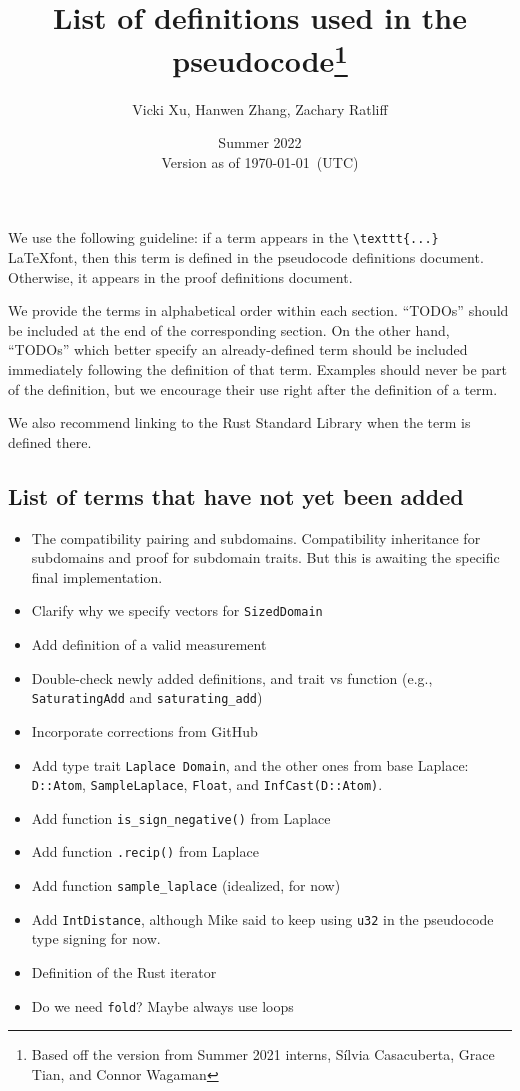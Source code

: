 \documentclass[11pt,a4paper]{article}
\title{List of definitions used in the pseudocode\footnote{Based off the version from Summer 2021 interns, S\'ilvia Casacuberta, Grace Tian, and Connor Wagaman}}
\author{Vicki Xu, Hanwen Zhang, Zachary Ratliff}
\date{Summer 2022 \\ Version as of \today~(UTC)}
\theoremstyle{definition}
\begin{document}
\maketitle

We use the following guideline: if a term appears in the \texttt{\textbackslash\texttt{texttt\{...\}}} \LaTeX font, then this term is defined in the pseudocode definitions document. Otherwise, it appears in the proof definitions document. 

We provide the terms in alphabetical order within each section. ``TODOs'' should be included at the end of the corresponding section. On the other hand, ``TODOs'' which better specify an already-defined term should be included immediately following the definition of that term. Examples should never be part of the definition, but we encourage their use right after the definition of a term.

We also recommend linking to the Rust Standard Library when the term is defined there.

\tableofcontents

\subsection{List of terms that have not yet been added}
\begin{itemize}
    \item The compatibility pairing and subdomains. Compatibility inheritance for subdomains and proof for subdomain traits. But this is awaiting the specific final implementation.
    \item Clarify why we specify vectors for \texttt{SizedDomain}
    \item Add definition of a valid measurement
    \item Double-check newly added definitions, and trait vs function (e.g., \texttt{SaturatingAdd} and \texttt{saturating\_add})
    \item Incorporate corrections from GitHub
    \item Add type trait \texttt{Laplace Domain}, and the other ones from base Laplace: \texttt{D::Atom}, \texttt{SampleLaplace}, \texttt{Float}, and \texttt{InfCast(D::Atom)}.
    \item Add function \texttt{is\_sign\_negative()} from Laplace
    \item Add function \texttt{.recip()} from Laplace
    \item Add function \texttt{sample\_laplace} (idealized, for now)
    \item Add \texttt{IntDistance}, although Mike said to keep using \texttt{u32} in the pseudocode type signing for now.
    \item Definition of the Rust iterator
    \item Do we need \texttt{fold}? Maybe always use loops
\end{itemize}
\end{document}
